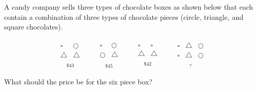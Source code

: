 \begin{question}
  \label{qst:candy}

  A candy company sells three types of chocolate boxes as shown below that each
  contain a combination of three types of chocolate pieces (circle, triangle,
  and square chocolates).

  \begin{align*}
    \underset{\displaystyle\$43}{\begin{array}{cc}
      \square & \bigcirc \\
      \bigtriangleup & \bigtriangleup \\
    \end{array}}\qquad
    \underset{\displaystyle\$45}{\begin{array}{cc}
      \square & \bigcirc \\
      \bigcirc & \bigtriangleup \\
    \end{array}}\qquad
    \underset{\displaystyle\$42}{\begin{array}{cc}
      \square & \square \\
      \bigtriangleup & \bigtriangleup \\
    \end{array}}\qquad
    \underset{\displaystyle?}{\begin{array}{ccc}
      \square & \bigtriangleup & \bigcirc \\
      \square & \bigtriangleup & \bigcirc \\
    \end{array}}
  \end{align*}

  What should the price be for the six piece box?
\end{question}

